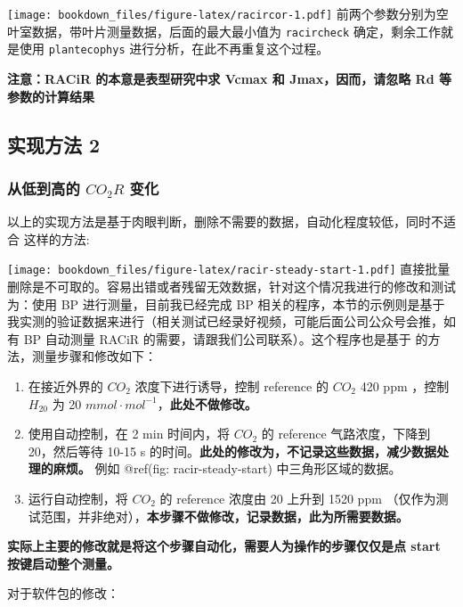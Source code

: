 \documentclass[
]{krantz}
\begin{document}
\texttt{[image: bookdown\_files/figure-latex/racircor-1.pdf]}
前两个参数分别为空叶室数据，带叶片测量数据，后面的最大最小值为 \texttt{racircheck} 确定，剩余工作就是使用 \texttt{plantecophys} 进行分析，在此不再重复这个过程。

\textbf{注意：RACiR 的本意是表型研究中求 Vcmax 和 Jmax，因而，请忽略 Rd 等参数的计算结果}

\hypertarget{racir_pkg_2}{%
\subsection{实现方法 2}\label{racir_pkg_2}}

\hypertarget{low-to-high}{%
\subsubsection{\texorpdfstring{从低到高的 \(CO_2R\) 变化}{从低到高的 CO\_2R 变化}}\label{low-to-high}}

以上的实现方法是基于肉眼判断，删除不需要的数据，自动化程度较低，同时不适合 \citet{Coursolle12019} 这样的方法:

\texttt{[image: bookdown\_files/figure-latex/racir-steady-start-1.pdf]}
直接批量删除是不可取的。容易出错或者残留无效数据，针对这个情况我进行的修改和测试为：使用 BP 进行测量，目前我已经完成 BP 相关的程序，本节的示例则是基于我实测的验证数据来进行（相关测试已经录好视频，可能后面公司公众号会推，如有 BP 自动测量 RACiR 的需要，请跟我们公司联系）。这个程序也是基于 \citet{Coursolle12019} 的方法，测量步骤和修改如下：

\begin{enumerate}
\def\labelenumi{\arabic{enumi}.}
\item
  在接近外界的 \(CO_2\) 浓度下进行诱导，控制 reference 的 \(CO_2\) 420 ppm ，控制 \(H_20\) 为 20 \(mmol \cdot mol^{-1}\)，\textbf{此处不做修改。}
\item
  使用自动控制，在 2 min 时间内，将 \(CO_2\) 的 reference 气路浓度，下降到 20，然后等待 10-15 s 的时间。\textbf{此处的修改为，不记录这些数据，减少数据处理的麻烦。} 例如 @ref(fig: racir-steady-start) 中三角形区域的数据。
\item
  运行自动控制，将 \(CO_2\) 的 reference 浓度由 20 上升到 1520 ppm （仅作为测试范围，并非绝对），\textbf{本步骤不做修改，记录数据，此为所需要数据。}
\end{enumerate}

\textbf{实际上主要的修改就是将这个步骤自动化，需要人为操作的步骤仅仅是点 start 按键启动整个测量。}

对于软件包的修改：
\end{document}
